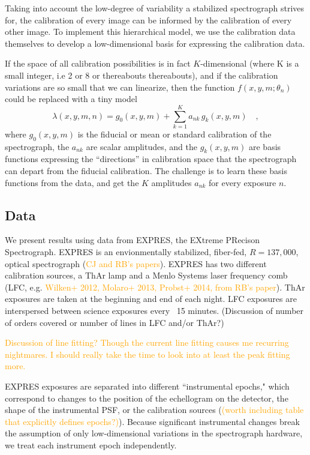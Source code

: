\documentclass[12pt, letterpaper]{article}
\newcommand{\lz}[1]{\textcolor{orange}{#1}}
\begin{document}
Taking into account the low-degree of variability a stabilized spectrograph strives for, the calibration of every image can be informed by the calibration of every other image.  To implement this hierarchical model, we use the calibration data themselves to develop a low-dimensional basis for expressing the calibration data.

If the space of all calibration possibilities is in fact $K$-dimensional (where K is a small integer, i.e 2 or 8 or thereabouts thereabouts), and if the calibration variations are so
small that we can linearize, then the function $f(x,y,m;\theta_{n})$ could
be replaced with a tiny model
\begin{equation}
\lambda(x,y,m,n) = g_0(x,y,m) + \sum_{k=1}^K a_{nk}\,g_k(x,y,m)
\quad ,
\end{equation}
where
$g_0(x,y,m)$ is the fiducial or mean or standard calibration of the
spectrograph,
the $a_{nk}$ are scalar amplitudes,
and the $g_k(x,y,m)$ are basis functions expressing the ``directions'' in calibration space that the spectrograph can depart from the
fiducial calibration.
The challenge is to learn these basis functions from the data, and get
the $K$ amplitudes $a_{nk}$ for every exposure $n$.

\subsection{Data}
We present results using data from EXPRES, the EXtreme PRecison Spectrograph.  EXPRES is an envionmentally stabilized, fiber-fed, $R=137,000$, optical spectrograph (\lz{CJ and RB's papers}).  EXPRES has two different calibration sources, a ThAr lamp and a Menlo Systems laser frequency comb (LFC, e.g. \lz{Wilken+ 2012, Molaro+ 2013, Probst+ 2014, from RB's paper}).  ThAr exposures are taken at the beginning and end of each night.  LFC exposures are interspersed between science exposures every ~15 minutes.  
(Discussion of number of orders covered or number of lines in LFC and/or ThAr?)

\lz{Discussion of line fitting?  Though the current line fitting causes me recurring nightmares.  I should really take the time to look into at least the peak fitting more.}

EXPRES exposures are separated into different ``instrumental epochs," which correspond to changes to the position of the echellogram on the detector, the shape of the instrumental PSF, or the calibration sources (\lz{(worth including table that explicitly defines epochs?)}).  Because significant instrumental changes break the assumption of only low-dimensional variations in the spectrograph hardware, we treat each instrument epoch independently.
\end{document}
